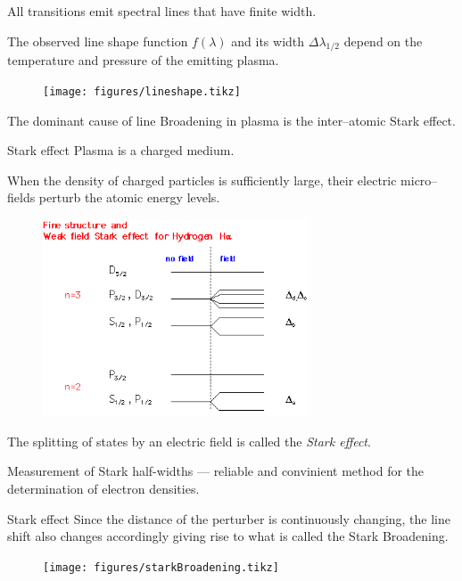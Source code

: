 \documentclass[]{beamer}
\begin{document}
\begin{frame}
  All transitions emit spectral lines that have finite width.
  
  The observed line shape function $f(\lambda)$ and its width $\Delta \lambda_{1/2}$ depend on the temperature and pressure of the emitting plasma.
\begin{figure}
\texttt{[image: figures/lineshape.tikz]}
\end{figure}
The dominant cause of line Broadening in plasma is the inter--atomic Stark effect.
\end{frame}
\begin{frame}{Stark effect}
  Plasma is a charged medium.

  When the density of charged particles is sufficiently large, their electric micro--fields perturb the atomic energy levels.
  \begin{figure}
      \includegraphics[width=0.7\textwidth]{figures/stark_effect_1.png}
  \end{figure}
  The splitting of states by an electric field is called the \emph{Stark effect}.

  Measurement of Stark half-widths --- reliable and convinient method for the determination of electron densities.
  \end{frame}
  \begin{frame}{Stark effect}
    Since the distance of the perturber is continuously changing, the line shift also changes accordingly giving rise to what is called the Stark Broadening.
    \begin{figure}
    \texttt{[image: figures/starkBroadening.tikz]}
    \end{figure}
  \end{frame}
\end{document}
